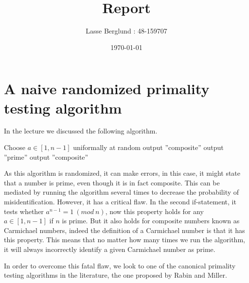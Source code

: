 \documentclass[12pt]{report}
\title{Report}
\author{Lasse Berglund : 48-159707}
\date{\today}
\begin{document}
\maketitle

\section*{A naive randomized primality testing algorithm}

In the lecture we discussed the following algorithm.


\begin{algorithmic}
    \State Choose $a \in [1,n-1]$ uniformally at random
      \State output ''composite''
    \Else
        \State output ''prime''
      \Else
        \State output ''composite''
      \EndIf
    \EndIf
  \EndFunction
\end{algorithmic}

As this algorithm is randomized, it can make errors, in this case, it might state that a number is prime, even though it is in fact composite. This can be mediated by running the algorithm several times to decrease the probability of misidentification. However, it has a critical flaw. In the second if-statement, it tests whether $a^{n-1} = 1 \ (mod \ n)$, now this property holds for any $a \in [1,n-1]$ if $n$ is prime. But it also holds for composite numbers known as Carmichael numbers, indeed the definition of a Carmichael number is that it has this property. This means that no matter how many times we run the algorithm, it will always incorrectly identify a given Carmichael number as prime.

In order to overcome this fatal flaw, we look to one of the canonical primality testing algorithms in the literature, the one proposed by Rabin and Miller.
\end{document}
